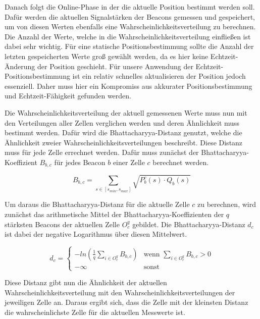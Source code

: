 Danach folgt die Online-Phase in der die aktuelle Position bestimmt werden soll. Dafür werden die aktuellen Signalstärken der Beacons gemessen und gespeichert, um von diesen Werten ebenfalls eine Wahrscheinlichkeitsverteilung zu berechnen. Die Anzahl der Werte, welche in die Wahrscheinlichkeitsverteilung einfließen ist dabei sehr wichtig.
Für eine statische Positionsbestimmung sollte die Anzahl der letzten gespeicherten Werte groß gewählt werden, da es hier keine Echtzeit-Änderung der Position geschieht.
Für unsere Anwendung der Echtzeit-Positionsbestimmung ist ein relativ schnelles aktualisieren der Position jedoch essenziell. Daher muss hier ein Kompromiss aus akkurater Positionsbestimmung und Echtzeit-Fähigkeit gefunden werden.

Die Wahrscheinlichkeitsverteilung der aktuell gemessenen Werte muss nun mit den Verteilungen aller Zellen verglichen werden und deren Ähnlichkeit muss bestimmt werden. Dafür wird die Bhattacharyya-Distanz genutzt, welche die Ähnlichkeit zweier Wahrscheinlichkeitsverteilungen beschreibt. 
Diese Distanz muss für jede Zelle errechnet werden. 
Dafür muss zunächst der Bhattacharyya-Koeffizient $B_{b, c}$ für jedes Beacon $b$ einer Zelle $c$ berechnet werden.

\begin{equation}
	B_{b, c} = \sum_{s \in [s_{min},s_{max}]} \sqrt{P_{b}^{c}(s) \cdot Q_{b}(s)}
\end{equation}

Um daraus die Bhattacharyya-Distanz für die aktuelle Zelle $c$ zu berechnen, wird zunächst das arithmetische Mittel der Bhattacharyya-Koeffizienten der $q$ stärksten Beacons der aktuellen Zelle $O_{c}^{q}$ gebildet. Die Bhattacharyya-Distanz $d_{c}$ ist dabei der negative Logarithmus über diesen Mittelwert.

\begin{equation}
	d_{c}= \begin{cases}
	-ln (\frac{1}{q} \sum_{i \in O_{c}^{q}} B_{b, c}) & \text{wenn } \sum_{i \in O_{c}^{q}} B_{b, c} > 0 \\
	- \infty & \text{sonst}
	\end{cases}
\end{equation}

Diese Distanz gibt nun die Ähnlichkeit der aktuellen Wahrscheinlichkeitsverteilung mit den Wahrscheinlichkeitsverteilungen der jeweiligen Zelle an. Daraus ergibt sich, dass die Zelle mit der kleinsten Distanz die wahrscheinlichste Zelle für die aktuellen Messwerte ist.

